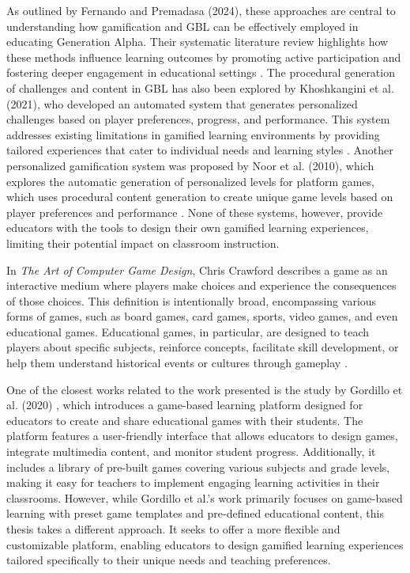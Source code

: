 As outlined by Fernando and Premadasa (2024), these approaches are central to understanding how gamification and GBL can be effectively employed in educating Generation Alpha. Their systematic literature review highlights how these methods influence learning outcomes by promoting active participation and fostering deeper engagement in educational settings \cite{fernando2024}. The procedural generation of challenges and content in GBL has also been explored by Khoshkangini et al. (2021), who developed an automated system that generates personalized challenges based on player preferences, progress, and performance. This system addresses existing limitations in gamified learning environments by providing tailored experiences that cater to individual needs and learning styles \cite{khoshkangini2021}. Another personalized gamification system was proposed by Noor et al. (2010), which explores the automatic generation of personalized levels for platform games, which uses procedural content generation to create unique game levels based on player preferences and performance \cite{noor2010}. None of these systems, however, provide educators with the tools to design their own gamified learning experiences, limiting their potential impact on classroom instruction.

In \emph{The Art of Computer Game Design}, Chris Crawford describes a game as an interactive medium where players make choices and experience the consequences of those choices. This definition is intentionally broad, encompassing various forms of games, such as board games, card games, sports, video games, and even educational games. Educational games, in particular, are designed to teach players about specific subjects, reinforce concepts, facilitate skill development, or help them understand historical events or cultures through gameplay \cite{crawford1982art}.

One of the closest works related to the work presented is the study by Gordillo et al. (2020) \cite{sgame2020}, which introduces a game-based learning platform designed for educators to create and share educational games with their students. The platform features a user-friendly interface that allows educators to design games, integrate multimedia content, and monitor student progress. Additionally, it includes a library of pre-built games covering various subjects and grade levels, making it easy for teachers to implement engaging learning activities in their classrooms. However, while Gordillo et al.’s work primarily focuses on game-based learning with preset game templates and pre-defined educational content, this thesis takes a different approach. It seeks to offer a more flexible and customizable platform, enabling educators to design gamified learning experiences tailored specifically to their unique needs and teaching preferences.